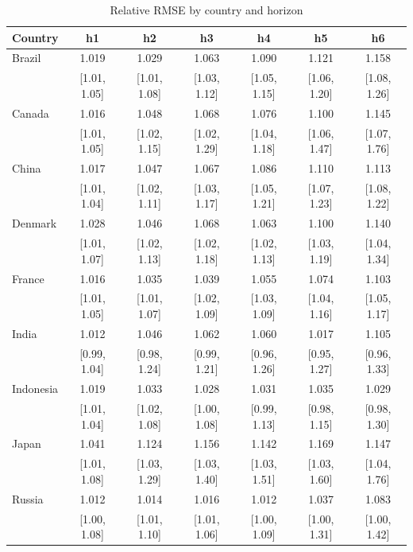 \begin{table}[htbp]
\centering
\caption{Relative RMSE by country and horizon}
\label{tab:relrmse_country_horizon}
{\fontsize{8}{10}\selectfont\setlength{\tabcolsep}{3pt}
\begin{tabular*}{\textwidth}{@{\extracolsep{\fill}}lcccccc}
\toprule
Country & h1 & h2 & h3 & h4 & h5 & h6 \\
\midrule
Brazil & 1.019 & 1.029 & 1.063 & 1.090 & 1.121 & 1.158 \\
 & [1.01, 1.05] & [1.01, 1.08] & [1.03, 1.12] & [1.05, 1.15] & [1.06, 1.20] & [1.08, 1.26] \\
\addlinespace
Canada & 1.016 & 1.048 & 1.068 & 1.076 & 1.100 & 1.145 \\
 & [1.01, 1.05] & [1.02, 1.15] & [1.02, 1.29] & [1.04, 1.18] & [1.06, 1.47] & [1.07, 1.76] \\
\addlinespace
China & 1.017 & 1.047 & 1.067 & 1.086 & 1.110 & 1.113 \\
 & [1.01, 1.04] & [1.02, 1.11] & [1.03, 1.17] & [1.05, 1.21] & [1.07, 1.23] & [1.08, 1.22] \\
\addlinespace
Denmark & 1.028 & 1.046 & 1.068 & 1.063 & 1.100 & 1.140 \\
 & [1.01, 1.07] & [1.02, 1.13] & [1.02, 1.18] & [1.02, 1.13] & [1.03, 1.19] & [1.04, 1.34] \\
\addlinespace
France & 1.016 & 1.035 & 1.039 & 1.055 & 1.074 & 1.103 \\
 & [1.01, 1.05] & [1.01, 1.07] & [1.02, 1.09] & [1.03, 1.09] & [1.04, 1.16] & [1.05, 1.17] \\
\addlinespace
India & 1.012 & 1.046 & 1.062 & 1.060 & 1.017 & 1.105 \\
 & [0.99, 1.04] & [0.98, 1.24] & [0.99, 1.21] & [0.96, 1.26] & [0.95, 1.27] & [0.96, 1.33] \\
\addlinespace
Indonesia & 1.019 & 1.033 & 1.028 & 1.031 & 1.035 & 1.029 \\
 & [1.01, 1.04] & [1.02, 1.08] & [1.00, 1.08] & [0.99, 1.13] & [0.98, 1.15] & [0.98, 1.30] \\
\addlinespace
Japan & 1.041 & 1.124 & 1.156 & 1.142 & 1.169 & 1.147 \\
 & [1.01, 1.08] & [1.03, 1.29] & [1.03, 1.40] & [1.03, 1.51] & [1.03, 1.60] & [1.04, 1.76] \\
\addlinespace
Russia & 1.012 & 1.014 & 1.016 & 1.012 & 1.037 & 1.083 \\
 & [1.00, 1.08] & [1.01, 1.10] & [1.01, 1.06] & [1.00, 1.09] & [1.00, 1.31] & [1.00, 1.42] \\

\end{tabular*}}
\end{table}
